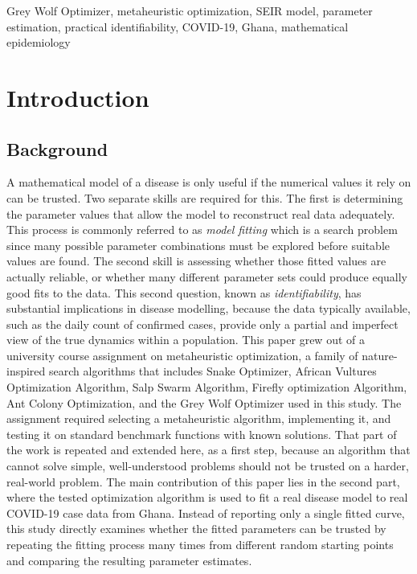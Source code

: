 \documentclass[journal]{IEEEtran}
\begin{document}
\begin{IEEEkeywords}
Grey Wolf Optimizer, metaheuristic optimization, SEIR model, parameter estimation, practical identifiability, COVID-19, Ghana, mathematical epidemiology
\end{IEEEkeywords}

\section{Introduction}

\subsection{Background}

A mathematical model of a disease is only useful if the numerical values it rely on can be trusted. Two separate skills are required for this. The first is determining the parameter values that allow the model to reconstruct real data adequately. This process is commonly referred to as \textit{model fitting} which is a search problem since many possible parameter combinations must be explored before suitable values are found. The second skill is assessing whether those fitted values are actually reliable, or whether many different parameter sets could produce equally good fits to the data. This second question, known as \textit{identifiability}, has substantial implications in disease modelling, because the data typically available, such as the daily count of confirmed cases, provide only a partial and imperfect view of the true dynamics within a population. This paper grew out of a university course assignment on metaheuristic optimization, a family of nature-inspired search algorithms that includes Snake Optimizer, African Vultures Optimization Algorithm, Salp Swarm Algorithm, Firefly optimization Algorithm, Ant Colony Optimization, and the Grey Wolf Optimizer used in this study. The assignment required selecting a metaheuristic algorithm, implementing it, and testing it on standard benchmark functions with known solutions. That part of the work is repeated and extended here, as a first step, because an algorithm that cannot solve simple, well-understood problems should not be trusted on a harder, real-world problem. The main contribution of this paper lies in the second part, where the tested optimization algorithm is used to fit a real disease model to real COVID-19 case data from Ghana. Instead of reporting only a single fitted curve, this study directly examines whether the fitted parameters can be trusted by repeating the fitting process many times from different random starting points and comparing the resulting parameter estimates.
\end{document}
